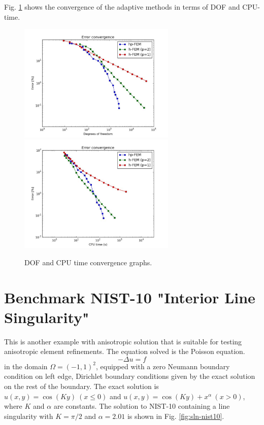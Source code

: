 \documentclass[12pt]{elsarticle}
\begin{document}
Fig. \ref{fig:nist-9-conv} shows the convergence of the adaptive methods in terms of DOF and CPU-time.

\begin{figure}[H]
\centering
\hspace{-50mm}
\includegraphics[width=7.5cm]{mafig57.pdf}\ \
\hspace{-10mm}
\includegraphics[width=7.5cm]{mafig58.pdf}
\hspace{-50mm}
\vspace{-2mm}
\caption{DOF and CPU time convergence graphs.}
\label{fig:nist-9-conv}
\end{figure}


\section{Benchmark NIST-10 "Interior Line Singularity"}
\label{sec:bench-10}

This is another example with anisotropic solution that is suitable for testing
anisotropic element refinements. The equation solved is the Poisson equation.
\begin{equation} \label{interior}
-\Delta u = f
\end{equation}
in the domain $\Omega = (-1, 1)^2$, equipped with a zero
Neumann boundary condition on left edge, Dirichlet boundary
conditions given by the exact solution on the rest of the boundary.
The exact solution is
$u(x,y) = \cos(Ky)\ (x \le 0)$ and $u(x,y) = \cos(Ky) + x^{\alpha}\ (x > 0)$,
where $K$ and $\alpha$ are constants.
The solution to NIST-10 containing a line singularity with $K = \pi/2$ and
$\alpha = 2.01$ is shown in Fig. \ref{fig:sln-nist10}.
\end{document}
